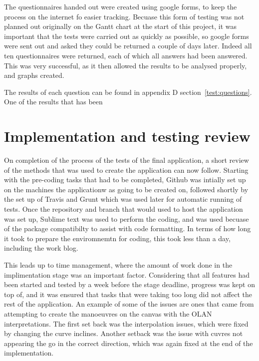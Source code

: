 The questionnaires handed out were created using google forms, to keep the process on the internet fo easier tracking. Becuase this form of testing was not planned out originally on the Gantt chart at the start of this project, it was important that the tests were carried out as quickly as possible, so google forms were sent out and asked they could be returned a couple of days later. Indeed all ten questionnaires were returned, each of which all answers had been answered. This was very successful, as it then allowed the results to be analysed properly, and graphs created.

The results of each question can be found in appendix D section~\ref{test:questions}. One of the results that has been

\section{Implementation and testing review}
On completion of the process of the tests of the final application, a short review of the methods that was used to create the application can now follow. Starting with the pre-coding tasks that had to be completed, Github was intially set up on the machines the applicationw as going to be created on, followed shortly by the set up of Travis and Grunt which was used later for automatic running of tests. Once the repository and branch that would used to host the application was set up, Sublime text was used to perform the coding, and was used becuase of the package compatibilty to assist with code formatting. In terms of how long it took to prepare the enviromnemtn for coding, this took less than a day, including the work blog.

This leads up to time management, where the amount of work done in the implimentation stage was an important factor. Considering that all features had been started and tested by a week before the stage deadline, progress was kept on top of, and it was ensured that tasks that were taking too long did not affect the rest of the application. An example of some of the issues are ones that came from attempting to create the manoeuvres on the canvas with the OLAN interpretations. The first set back was the interpolation issues, which were fixed by changing the curve inclines. Another setback was the issue with cuvres not appearing the go in the correct direction, which was again fixed at the end of the implementation. 

